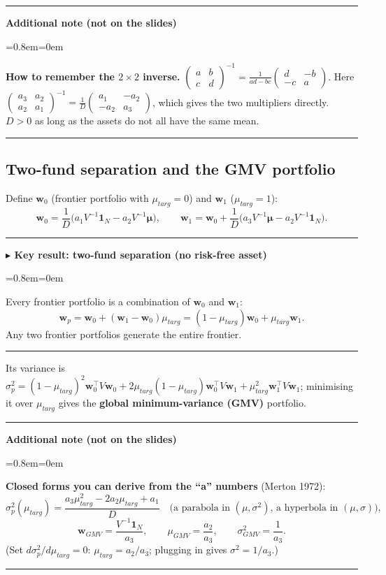 \documentclass[11pt,a4paper]{report}
\newenvironment{notebox}[1]
  {\par\medskip\Needspace{6\baselineskip}\noindent\rule{\linewidth}{0.4pt}\par\nopagebreak
   \noindent\textbf{#1}\par\nopagebreak
   \begin{list}{}{\leftmargin=0.8em\rightmargin=0em\topsep=2pt}\item[]}
  {\end{list}\nopagebreak\noindent\rule{\linewidth}{0.4pt}\par\medskip}
\newenvironment{keybox}[1][]{\begin{notebox}{$\blacktriangleright$ Key result#1}}{\end{notebox}}
\newenvironment{addnote}{\begin{notebox}{Additional note (not on the slides)}}{\end{notebox}}
\newcommand{\one}{\mathbf{1}_N}
\newcommand{\w}{\bm{w}}
\newcommand{\T}{^{\top}}
\newcommand{\mub}{\bm{\mu}}
\begin{document}
\begin{addnote}
\textbf{How to remember the $2\times2$ inverse.}
$\begin{pmatrix}a&b\\c&d\end{pmatrix}^{-1}=\frac{1}{ad-bc}\begin{pmatrix}d&-b\\-c&a\end{pmatrix}$.
Here $\begin{pmatrix}a_3&a_2\\a_2&a_1\end{pmatrix}^{-1}=\frac1D\begin{pmatrix}a_1&-a_2\\-a_2&a_3\end{pmatrix}$,
which gives the two multipliers directly. $D>0$ as long as the assets do not all have the same mean.
\end{addnote}

\subsection{Two-fund separation and the GMV portfolio}
Define $\w_0$ (frontier portfolio with $\mu_{targ}=0$) and $\w_1$ ($\mu_{targ}=1$):
\[
\w_0=\frac1D\big(a_1V^{-1}\one-a_2V^{-1}\mub\big),\qquad
\w_1=\w_0+\frac1D\big(a_3V^{-1}\mub-a_2V^{-1}\one\big).
\]
\begin{keybox}[: two-fund separation (no risk-free asset)]
Every frontier portfolio is a combination of $\w_0$ and $\w_1$:
\[ \w_p=\w_0+(\w_1-\w_0)\mu_{targ}=(1-\mu_{targ})\w_0+\mu_{targ}\w_1 . \]
Any two frontier portfolios generate the entire frontier.
\end{keybox}
Its variance is
$\sigma_p^2=(1-\mu_{targ})^2\w_0\T V\w_0+2\mu_{targ}(1-\mu_{targ})\w_0\T V\w_1+\mu_{targ}^2\w_1\T V\w_1$;
minimising it over $\mu_{targ}$ gives the \textbf{global minimum-variance (GMV)} portfolio.

\begin{addnote}
\textbf{Closed forms you can derive from the ``a'' numbers} (Merton 1972):
\[
\sigma_p^2(\mu_{targ})=\frac{a_3\mu_{targ}^2-2a_2\mu_{targ}+a_1}{D}
\quad\text{(a parabola in $(\mu,\sigma^2)$, a hyperbola in $(\mu,\sigma)$)},
\]
\[
\w_{GMV}=\frac{V^{-1}\one}{a_3},\qquad \mu_{GMV}=\frac{a_2}{a_3},\qquad \sigma^2_{GMV}=\frac1{a_3}.
\]
(Set $d\sigma_p^2/d\mu_{targ}=0$: $\mu_{targ}=a_2/a_3$; plugging in gives $\sigma^2=1/a_3$.)
\end{addnote}
\end{document}
